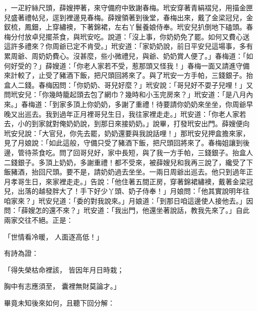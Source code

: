 \begin{showcontents}{}
，一疋紵絲尺頭，薛嫂押著，來守備府中致謝春梅。玳安穿著青絹褶兒，用描金匣兒盛著禮帖兒，逕到裡邊見春梅。薛嫂領著到後堂，春梅出來，戴了金梁冠兒，金釵梳，鳳鈿，上穿繡襖，下著錦裙，左右丫鬟養娘侍奉。玳安兒扒倒地下磕頭。春梅分付放卓兒擺茶食，與玳安吃。說道：「沒上事，你奶奶免了罷。如何又費心送這許多禮來？你周爺已定不肯受。」玳安道：「家奶奶說，前日平安兒這場事，多有累周爺、周奶奶費心。沒甚麼，些小微禮兒，與爺、奶奶賞人便了。」春梅道：「如何好受的？」薛嫂道：「你老人家若不受，惹那頭又怪我！」春梅一面又請進守備來計較了，止受了豬酒下飯，把尺頭回將來了。與了玳安一方手帕，三錢銀子。抬盒人二錢。春梅因問：「你奶奶、哥兒好麼？」玳安說：「哥兒好不耍子兒哩！」又問玳安兒：「你幾時籠起頭去包了網巾？幾時和小玉完房來？」玳安道：「是八月內來。」春梅道：「到家多頂上你奶奶，多謝了重禮！待要請你奶奶來坐坐，你周爺早晚又出巡去。我到過年正月裡哥兒生日，我往家裡走走。」玳安道：「你老人家若去，小的到家就對俺奶奶說，到那日來接奶奶。」說畢，打發玳安出門。薛嫂便向玳安兒說：「大官兒，你先去罷，奶奶還要與我說話哩！」那玳安兒押盒擔來家，見了月娘說：「如此這般，守備只受了豬酒下飯，把尺頭回將來了。春梅姐讓到後邊，管待茶食吃。問了回哥兒好，家中長短，與了我一方手帕，三錢銀子。抬盒人二錢銀子。多頂上奶奶，多謝重禮！都不受來，被薛嫂兒和我再三說了，纔受了下飯豬酒，抬回尺頭。要不是，請奶奶過去坐坐。一兩日周爺出巡去。他只到過年正月孝哥生日，來家裡走走。」告說：「他住著五間正房，穿著錦裙繡襖，戴著金梁冠兒，出落的越發胖大了！手下好少丫頭、奶子侍奉！」月娘問：「他其實說明年往咱家來？」玳安兒道：「委的對我說來。」月娘道：「到那日咱這邊使人接他去。」因問：「薛嫂怎的還不來？」玳安道：「我出門，他還坐著說話，教我先來了。」自此兩家交往不絕。正是：

「世情看冷暖，  人面逐高低！」

有詩為證：

「得失榮枯命裡該，  皆因年月日時栽；

胸中有志應須至，  囊裡無財莫論才。」

畢竟未知後來如何，且聽下回分解：





\end{showcontents}


